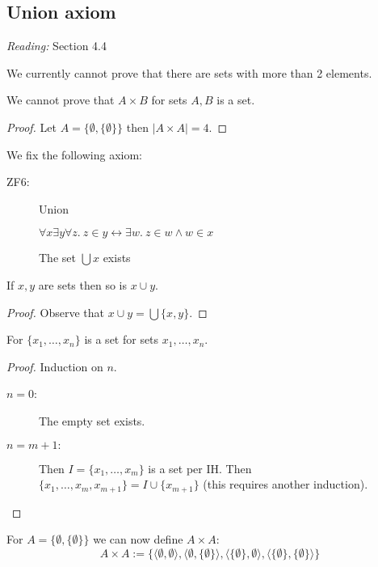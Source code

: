 \documentclass{whrartcl}
\newcommand{\abs}[1]{|#1|}
\begin{document}
\subsection{Union axiom}
\emph{Reading:} Section 4.4

\begin{observation}
  We currently cannot prove that there are sets with more than 2 elements.
\end{observation}
\begin{corollary}
  We cannot prove that $A \times B$ for sets $A, B$ is a set.
\end{corollary}
\begin{proof}
  Let $A = \{\emptyset, \{\emptyset\}\}$ then $\abs{A \times A} = 4$.
\end{proof}

\begin{definition}
  We fix the following axiom:
  \begin{description}
  \item[ZF6:] Union

    $\forall x \exists y \forall z.~z \in y \leftrightarrow \exists w.~z \in
    w \wedge w \in x$

    The set $\bigcup x$ exists
  \end{description}
\end{definition}

\begin{proposition}[Union]
  If $x, y$ are sets then so is $x \cup y$.
\end{proposition}
\begin{proof}
   Observe that $x \cup y = \bigcup \{x, y\}$.
\end{proof}

\begin{proposition}
  For $\{x_1, \ldots, x_n\}$ is a set for sets $x_1, \ldots, x_n$.
\end{proposition}
\begin{proof}
  Induction on $n$.
  \begin{description}
  \item[$n = 0$:] The empty set exists.
  \item[$n = m + 1:$] Then $I = \{x_1, \ldots, x_m\}$ is a set per IH. Then $\{x_1,
    \ldots, x_m, x_{m + 1}\} = I \cup \{x_{m + 1}\}$ (this requires another induction).
  \end{description}
\end{proof}

\begin{remark}
  For $A = \{\emptyset, \{\emptyset\}\}$ we can now define $A \times A$:
  \[
    A \times A := \{\langle \emptyset, \emptyset \rangle, \langle \emptyset,
    \{\emptyset\} \rangle, \langle \{\emptyset\}, \emptyset \rangle, \langle
    \{\emptyset\}, \{\emptyset\} \rangle\}
  \]
\end{remark}
\end{document}
